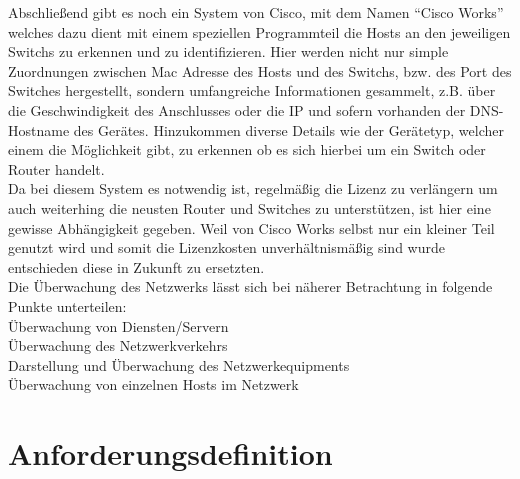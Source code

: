 Abschließend gibt es noch ein System von Cisco, mit dem Namen “Cisco Works” welches dazu dient mit einem speziellen Programmteil die Hosts an den jeweiligen Switchs zu erkennen und zu identifizieren. Hier werden nicht nur simple Zuordnungen zwischen Mac Adresse des Hosts und des Switchs, bzw. des Port des Switches hergestellt, sondern umfangreiche Informationen gesammelt, z.B. über die Geschwindigkeit des Anschlusses oder die IP und sofern vorhanden der DNS-Hostname des Gerätes. Hinzukommen diverse Details wie der Gerätetyp, welcher einem die Möglichkeit gibt, zu erkennen ob es sich hierbei um ein Switch oder Router handelt.\\
Da bei diesem System es notwendig ist, regelmäßig die Lizenz zu verlängern um auch weiterhing die neusten Router und Switches zu unterstützen, ist hier eine gewisse Abhängigkeit gegeben. Weil von Cisco Works selbst nur ein kleiner Teil genutzt wird und somit die Lizenzkosten unverhältnismäßig sind wurde entschieden diese in Zukunft zu ersetzten.\\

Die Überwachung des Netzwerks lässt sich bei näherer Betrachtung in folgende Punkte unterteilen:\\
Überwachung von Diensten/Servern\\
Überwachung des Netzwerkverkehrs\\
Darstellung und Überwachung des Netzwerkequipments\\
Überwachung von einzelnen Hosts im Netzwerk\\

\section{Anforderungsdefinition}
\label{sec:anfdef}

